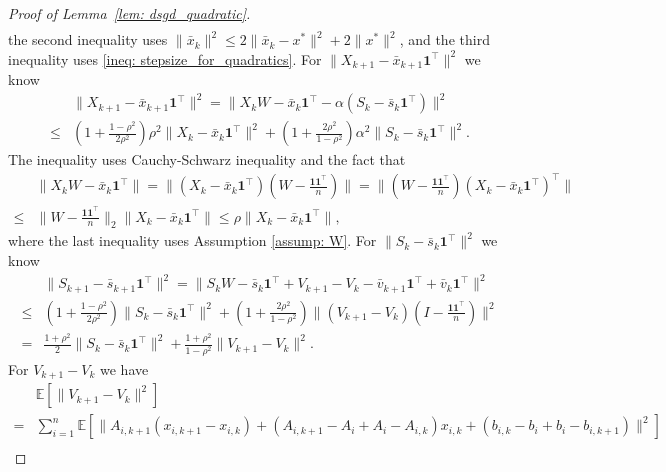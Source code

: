 \documentclass{article}
\theoremstyle{plain}
\theoremstyle{definition}
\theoremstyle{remark}
\newcommand{\E}{\mathbb{E}}
\newcommand{\T}{^{\top}}
\newcommand{\bfone}{\mathbf{1}}
\newcommand{\bfonet}{\mathbf{1}^{\top}}
\begin{document}
\begin{proof}[Proof of Lemma~\ref{lem: dsgd_quadratic}]
\begin{align*}
    \end{align*}
    the second inequality uses $\|\bar{x}_k\|^2\leq 2\|\bar{x}_k - x^*\|^2 + 2\|x^*\|^2$, and the third inequality uses \eqref{ineq: stepsize_for_quadratics}. For $\|X_{k+1} - \bar{x}_{k+1}\bfonet\|^2$ we know
    \begin{equation}\label{ineq: consensus_ineq}
        \begin{aligned}
            &\|X_{k+1} - \bar{x}_{k+1}\bfonet\|^2 = \|X_kW - \bar{x}_k\bfonet - \alpha (S_k - \bar{s}_k\bfonet)\|^2\\
        \leq &\left(1 + \frac{1-\rho^2}{2\rho^2}\right)\rho^2\|X_k-\bar{x}_k\bfonet\|^2 + \left(1 + \frac{2\rho^2}{1-\rho^2}\right)\alpha^2\|S_k-\bar{s}_k\bfonet\|^2.
        \end{aligned}
    \end{equation}
    The inequality uses Cauchy-Schwarz inequality and the fact that 
    \begin{align*}
        &\|X_kW - \bar{x}_k\bfonet\| = \|\left(X_k - \bar{x}_k\bfonet\right)\left(W - \frac{\bfone\bfonet}{n}\right)\| = \|\left(W - \frac{\bfone\bfonet}{n}\right)\left(X_k - \bar{x}_k\bfonet\right)\T\|\\
        \leq &\|W - \frac{\bfone\bfonet}{n}\|_2\|X_k - \bar{x}_k\bfonet\|\leq \rho\|X_k - \bar{x}_k\bfonet\|,
    \end{align*}
    where the last inequality uses Assumption \ref{assump: W}. For $\|S_{k} - \bar{s}_{k}\bfonet\|^2$ we know
    \begin{equation}\label{ineq: S_cons_onestep}
        \begin{aligned}
            & \|S_{k+1} - \bar{s}_{k+1}\bfonet\|^2 = \|S_kW - \bar{s}_k\bfonet + V_{k+1} - V_k - \bar{v}_{k+1}\bfonet + \bar{v}_k\bfonet\|^2 \\
        \leq &\left(1 + \frac{1-\rho^2}{2\rho^2}\right)\|S_k - \bar{s}_k\bfonet\|^2 + \left(1 + \frac{2\rho^2}{1-\rho^2}\right)\|\left(V_{k+1}-V_k\right)\left(I - \frac{\bfone\bfonet}{n}\right)\|^2 \\
        = &\frac{1+\rho^2}{2}\|S_k - \bar{s}_k\bfonet\|^2 + \frac{1+\rho^2}{1-\rho^2}\|V_{k+1} - V_k\|^2.
        \end{aligned}
    \end{equation}
    For $V_{k+1} - V_k$ we have
    \begin{align*}
        &\E\left[\|V_{k+1} - V_k\|^2\right] \\
        = &\sum_{i=1}^{n}\E\left[\|A_{i,k+1}(x_{i,k+1} - x_{i,k}) + (A_{i,k+1} - A_i + A_i - A_{i,k})x_{i,k} +(b_{i,k} - b_i + b_i - b_{i,k+1})\|^2\right] \\

\end{align*}
\end{proof}
\end{document}

